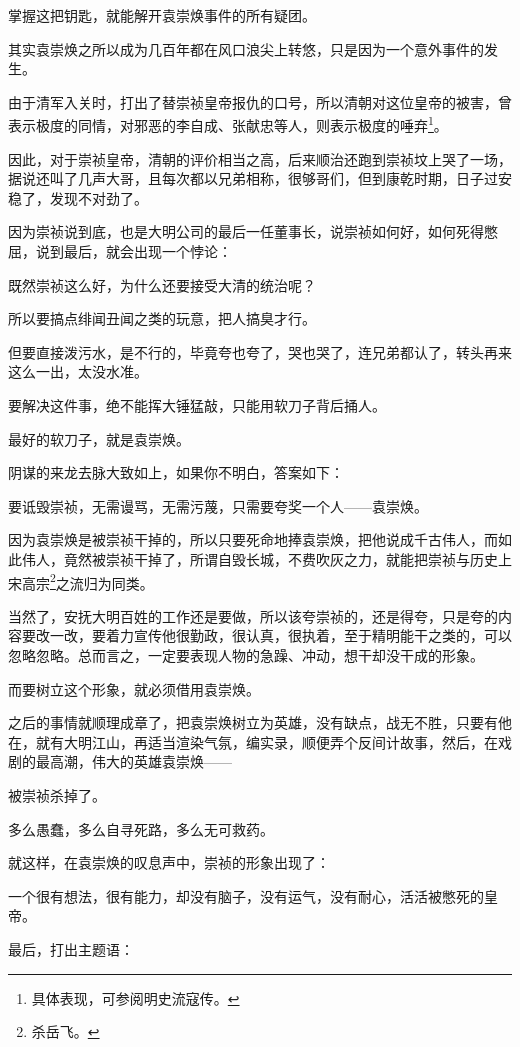 \begin{multicols}{\theparacolNo}
掌握这把钥匙，就能解开袁崇焕事件的所有疑团。

其实袁崇焕之所以成为几百年都在风口浪尖上转悠，只是因为一个意外事件的发生。

由于清军入关时，打出了替崇祯皇帝报仇的口号，所以清朝对这位皇帝的被害，曾表示极度的同情，对邪恶的李自成、张献忠等人，则表示极度的唾弃\footnote{具体表现，可参阅明史流寇传。}。

因此，对于崇祯皇帝，清朝的评价相当之高，后来顺治还跑到崇祯坟上哭了一场，据说还叫了几声大哥，且每次都以兄弟相称，很够哥们，但到康乾时期，日子过安稳了，发现不对劲了。

因为崇祯说到底，也是大明公司的最后一任董事长，说崇祯如何好，如何死得憋屈，说到最后，就会出现一个悖论：

既然崇祯这么好，为什么还要接受大清的统治呢？

所以要搞点绯闻丑闻之类的玩意，把人搞臭才行。

但要直接泼污水，是不行的，毕竟夸也夸了，哭也哭了，连兄弟都认了，转头再来这么一出，太没水准。

要解决这件事，绝不能挥大锤猛敲，只能用软刀子背后捅人。

最好的软刀子，就是袁崇焕。

阴谋的来龙去脉大致如上，如果你不明白，答案如下：

要诋毁崇祯，无需谩骂，无需污蔑，只需要夸奖一个人——袁崇焕。

因为袁崇焕是被崇祯干掉的，所以只要死命地捧袁崇焕，把他说成千古伟人，而如此伟人，竟然被崇祯干掉了，所谓自毁长城，不费吹灰之力，就能把崇祯与历史上宋高宗\footnote{杀岳飞。}之流归为同类。

当然了，安抚大明百姓的工作还是要做，所以该夸崇祯的，还是得夸，只是夸的内容要改一改，要着力宣传他很勤政，很认真，很执着，至于精明能干之类的，可以忽略忽略。总而言之，一定要表现人物的急躁、冲动，想干却没干成的形象。

而要树立这个形象，就必须借用袁崇焕。

之后的事情就顺理成章了，把袁崇焕树立为英雄，没有缺点，战无不胜，只要有他在，就有大明江山，再适当渲染气氛，编实录，顺便弄个反间计故事，然后，在戏剧的最高潮，伟大的英雄袁崇焕——

被崇祯杀掉了。

多么愚蠢，多么自寻死路，多么无可救药。

就这样，在袁崇焕的叹息声中，崇祯的形象出现了：

一个很有想法，很有能力，却没有脑子，没有运气，没有耐心，活活被憋死的皇帝。

最后，打出主题语：


\end{multicols}
